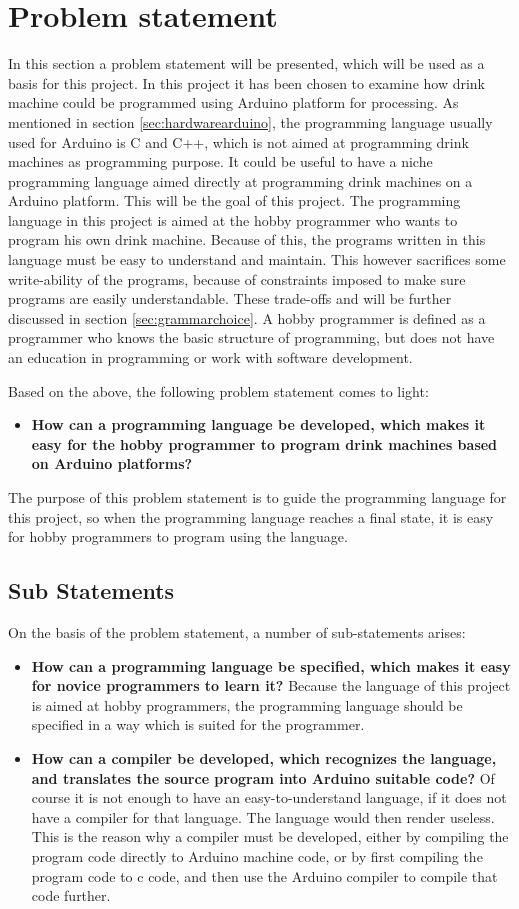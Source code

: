 \section{Problem statement}
In this section a problem statement will be presented, which will be used as a basis for this project. In this project it has been chosen to examine how drink machine could be programmed using Arduino platform for processing. As mentioned in section \ref{sec:hardwarearduino}, the programming language usually used for Arduino is C and C++, which is not aimed at programming drink machines as programming purpose. It could be useful to have a niche programming language aimed directly at programming drink machines on a Arduino platform. This will be the goal of this project. The programming language in this project is aimed at the hobby programmer who wants to program his own drink machine. Because of this, the programs written in this language must be easy to understand and maintain. This however sacrifices some write-ability of the programs, because of constraints imposed to make sure programs are easily understandable. These trade-offs and will be further discussed in section \ref{sec:grammarchoice}. A hobby programmer is defined as a programmer who knows the basic structure of programming, but does not have an education in programming or work with software development.

Based on the above, the following problem statement comes to light:
\begin{itemize}
	\item \textbf{How can a programming language be developed, which makes it easy for the hobby programmer to program drink machines based on Arduino platforms?}
\end{itemize}
The purpose of this problem statement is to guide the programming language for this project, so when the programming language reaches a final state, it is easy for hobby programmers to program using the language. 

\subsection{Sub Statements}
On the basis of the problem statement, a number of sub-statements arises:
\begin{itemize}
	\item \textbf{How can a programming language be specified, which makes it easy for novice programmers to learn it?} Because the language of this project is aimed at hobby programmers, the programming language should be specified in a way which is suited for the programmer.
	\item \textbf{How can a compiler be developed, which recognizes the language, and translates the source program into Arduino suitable code?} Of course it is not enough to have an easy-to-understand language, if it does not have a compiler for that language. The language would then render useless. This is the reason why a compiler must be developed, either by compiling the program code directly to Arduino machine code, or by first compiling the program code to c code, and then use the Arduino compiler to compile that code further. 
\end{itemize}